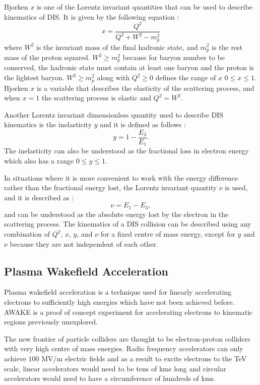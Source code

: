 \documentclass[journal, a4paper,11pt]{IEEEtran}
\begin{document}
Bjorken $x$ is one of the Lorentz invariant quantities that can be used to describe kinematics of DIS. It is given by the following equation \cite{Modern}: 
\begin{equation}
	x = \frac{Q^2}{Q^2 + W^2 - m_p^2}
	\label{eq:x}
\end{equation}
where $W^2$ is the invariant mass of the final hadronic state, and $m_p^2$ is the rest mass of the proton squared. $W^2 \geq m_p^2$ because for baryon number to be conserved, the hadronic state must contain at least one baryon and the proton is the lightest baryon. $W^2 \geq m_p^2$ along with $Q^2 \geq 0$ defines the range of $x$ $0 \leq x \leq 1$. Bjorken $x$ is a variable that describes the elasticity of the scattering process, and when $x = 1$ the scattering process is elastic and $Q^2 = W^2$.

Another Lorentz invariant dimensionless quantity used to describe DIS kinematics is the inelasticity $y$ and it is defined as follows \cite{Modern}:
\begin{equation}
	y = 1-\frac{E_3}{E_1}.
	\label{eq:y}
\end{equation}
The inelasticity can also be understood as the fractional loss in electron energy which also has a range $0 \leq y \leq 1$.

In situations where it is more convenient to work with the energy difference rather than the fractional energy lost, the Lorentz invariant quantity $\nu$ is used, and it is described as \cite{Modern}:
\begin{equation}
	\nu = E_1 - E_3,
	\label{eq:nu}
\end{equation}
and can be understood as the absolute energy lost by the electron in the scattering process.
The kinematics of a DIS collision can be described using any combination of $Q^2$, $x$, $y$, and $\nu$ for a fixed centre of mass energy, except for $y$ and $\nu$ because they are not independent of each other.

\subsection*{\textbf{Plasma Wakefield Acceleration}}

Plasma wakefield acceleration is a technique used for linearly accelerating electrons to sufficiently high energies which have not been achieved before. AWAKE \cite{AWAKE1,AWAKE2} is a proof of concept experiment for accelerating electrons to kinematic regions previously unexplored.

The new frontier of particle colliders are thought to be electron-proton colliders with very high centre of mass energies. Radio frequency accelerators can only achieve $100$ MV/m electric fields \cite{1115} and as a result to excite electrons to the TeV scale, linear accelerators would need to be tens of kms long and circular accelerators would need to have a circumference of hundreds of kms. 
\end{document}
